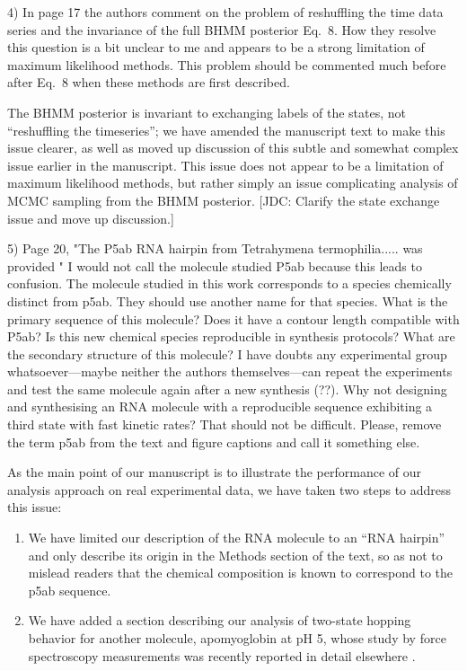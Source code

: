 \documentclass[ucb,qb3,10pt,fullfrom]{ucletter}
\begin{document}
\begin{letter}{}
\color{red}
4) In page 17 the authors comment on the problem of reshuffling the time data series and the invariance of the full BHMM posterior Eq.~8. How they resolve this question is a bit unclear to me and appears to be a strong limitation of maximum likelihood methods. This problem should be commented much before after Eq.~8 when these methods are first described.
\color{black}

The BHMM posterior is invariant to exchanging labels of the states, not ``reshuffling the timeseries''; we have amended the manuscript text to make this issue clearer, as well as moved up discussion of this subtle and somewhat complex issue earlier in the manuscript.
This issue does not appear to be a limitation of maximum likelihood methods, but rather simply an issue complicating analysis of MCMC sampling from the BHMM posterior.
{\color{blue} [JDC: Clarify the state exchange issue and move up discussion.]} 

\color{red}
5) Page 20, "The P5ab RNA hairpin from Tetrahymena termophilia..... was provided " I would not call the molecule studied P5ab because this leads to confusion. The molecule studied in this work corresponds to a species chemically distinct from p5ab. They should use another name for that species. What is the primary sequence of this molecule? Does it have a contour length compatible with P5ab? Is this new chemical species reproducible in synthesis protocols? What are the secondary structure of this molecule? I have doubts any experimental group whatsoever---maybe neither the authors themselves---can repeat the experiments and test the same molecule again after a new synthesis (??). Why not designing and synthesising an RNA molecule with a reproducible sequence exhibiting a third state with fast kinetic rates? That should not be difficult. Please, remove the term p5ab from the text and figure captions and call it something else.
\color{black}

As the main point of our manuscript is to illustrate the performance of our analysis approach on real experimental data, we have taken two steps to address this issue:
\begin{enumerate}
\item We have limited our description of the RNA molecule to an ``RNA hairpin'' and only describe its origin in the Methods section of the text, so as not to mislead readers that the chemical composition is known to correspond to the p5ab sequence. 
\item We have added a section describing our analysis of two-state hopping behavior for another molecule, apomyoglobin at pH 5, whose study by force spectroscopy measurements was recently reported in detail elsewhere \cite{elms:pnas:2012:apo-myoglobin}. 
\end{enumerate}


\end{letter}
\end{document}
